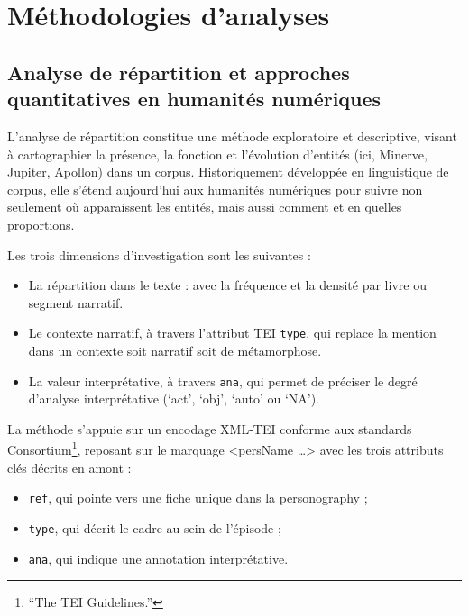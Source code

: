 \documentclass[
  letterpaper,
  DIV=11,
  numbers=noendperiod]{scrreprt}
\providecommand{\tightlist}{%
  \setlength{\itemsep}{0pt}\setlength{\parskip}{0pt}}\usepackage{longtable,booktabs,array}
\begin{document}
\section{Méthodologies d'analyses}\label{muxe9thodologies-danalyses}

\subsection{Analyse de répartition et approches quantitatives en
humanités
numériques}\label{analyse-de-ruxe9partition-et-approches-quantitatives-en-humanituxe9s-numuxe9riques}

L'analyse de répartition constitue une méthode exploratoire et
descriptive, visant à cartographier la présence, la fonction et
l'évolution d'entités (ici, Minerve, Jupiter, Apollon) dans un corpus.
Historiquement développée en linguistique de corpus, elle s'étend
aujourd'hui aux humanités numériques pour suivre non seulement où
apparaissent les entités, mais aussi comment et en quelles proportions.

Les trois dimensions d'investigation sont les suivantes :

\begin{itemize}
\tightlist
\item
  La répartition dans le texte : avec la fréquence et la densité par
  livre ou segment narratif.
\item
  Le contexte narratif, à travers l'attribut TEI \texttt{type}, qui
  replace la mention dans un contexte soit narratif soit de
  métamorphose.
\item
  La valeur interprétative, à travers \texttt{ana}, qui permet de
  préciser le degré d'analyse interprétative (`act', `obj', `auto' ou
  `NA').
\end{itemize}

La méthode s'appuie sur un encodage XML-TEI conforme aux standards
Consortium\footnote{{``The {TEI} Guidelines.''}}, reposant sur le
marquage \textless persName \ldots\textgreater{} avec les trois
attributs clés décrits en amont :

\begin{itemize}
\tightlist
\item
  \texttt{ref}, qui pointe vers une fiche unique dans la personography ;
\item
  \texttt{type}, qui décrit le cadre au sein de l'épisode ;
\item
  \texttt{ana}, qui indique une annotation interprétative.
\end{itemize}
\end{document}
